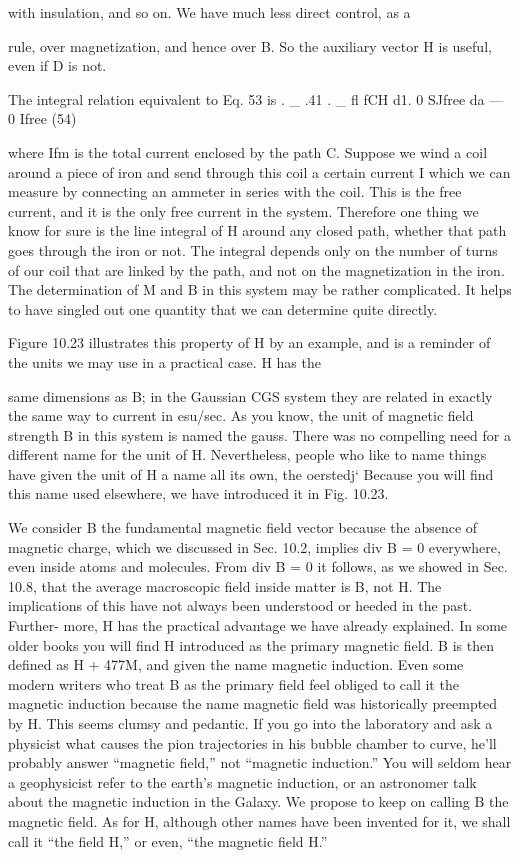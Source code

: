 {{%
with insulation, and so on. We have much less direct control, as a

rule, over magnetization, and hence over B. So the auxiliary vector
H is useful, even if D is not.

The integral relation equivalent to Eq. 53 is
. _ .41 . _ fl
fCH d1. 0 SJfree da ---  0 Ifree (54)

where Ifm is the total current enclosed by the path C. Suppose we
wind a coil around a piece of iron and send through this coil a certain
current I which we can measure by connecting an ammeter in
series with the coil. This is the free current, and it is the only free
current in the system. Therefore one thing we know for sure is the
line integral of H around any closed path, whether that path goes
through the iron or not. The integral depends only on the number
of turns of our coil that are linked by the path, and not on the magnetization
in the iron. The determination of M and B in this system
may be rather complicated. It helps to have singled out one quantity
that we can determine quite directly.

Figure 10.23 illustrates this property of H by an example, and is
a reminder of the units we may use in a practical case. H has the

same dimensions as B; in the Gaussian CGS system they are related
in exactly the same way to current in esu/sec. As you know, the
unit of magnetic field strength B in this system is named the gauss.
There was no compelling need for a different name for the unit of H.
Nevertheless, people who like to name things have given the unit
of H a name all its own, the oerstedj‘ Because you will find this
name used elsewhere, we have introduced it in Fig. 10.23.

We consider B the fundamental magnetic field vector because the
absence of magnetic charge, which we discussed in Sec. 10.2, implies
div B = 0 everywhere, even inside atoms and molecules. From
div B = 0 it follows, as we showed in Sec. 10.8, that the average
macroscopic field inside matter is B, not H. The implications of
this have not always been understood or heeded in the past. Further-
more, H has the practical advantage we have already explained. In
some older books you will find H introduced as the primary magnetic
field. B is then defined as H + 477M, and given the name magnetic
induction. Even some modern writers who treat B as the primary
field feel obliged to call it the magnetic induction because the name
magnetic field was historically preempted by H. This seems clumsy
and pedantic. If you go into the laboratory and ask a physicist what
causes the pion trajectories in his bubble chamber to curve, he'll
probably answer ``magnetic field,'' not ``magnetic induction.'' You
will seldom hear a geophysicist refer to the earth's magnetic 
induction, or an astronomer talk about the magnetic induction in the
Galaxy. We propose to keep on calling B the magnetic field. As
for H, although other names have been invented for it, we shall call
it ``the field H,'' or even, ``the magnetic field H.''

}}
